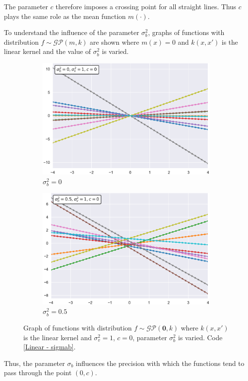The parameter $c$ therefore imposes a crossing point for all straight lines. Thus $c$ plays the same role as the mean function $m(\cdot)$.

To understand the influence of the parameter $\sigma_b^2$, graphs of functions with distribution $f\sim \mathcal{GP}(m,k)$ are shown where $m(x)=0$ and $k(x,x')$ is the linear kernel and the value of $\sigma_b^2$ is varied.

\begin{figure}[h]
\centering
\begin{subfigure}{.5\textwidth}
  \centering
  \includegraphics[width=\linewidth]{images/Gaussian process/Linear - sigmab=0.pdf}
  \caption{$\sigma_b^2=0$}
\end{subfigure}%
\begin{subfigure}{.5\textwidth}
  \centering
  \includegraphics[width=\linewidth]{images/Gaussian process/Linear - sigmab=05.pdf}
  \caption{$\sigma_b^2=0.5$}
\end{subfigure}
\caption{Graph of functions with distribution $f\sim \mathcal{GP}(\bm{0},k)$ where $k(x,x')$ is the linear kernel and $\sigma_v^2=1$, $c=0$, parameter $\sigma_b^2$ is varied. Code \ref{Linear - sigmab}.}
\label{10 sample linear modified sigmab}
\end{figure}
Thus, the parameter $\sigma_b$ influences the precision with which the functions tend to pass through the point $(0,c)$.

